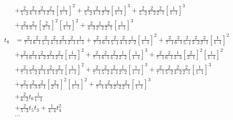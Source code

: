 \begin{equation*}
\begin{aligned}
\\
&
+ \frac{2}{5 \cdot 2} 
  \frac{2}{4 \cdot 1}
  \frac{2}{3 \cdot 1} 
  \frac{2}{2 \cdot 1} 
  \left[
  \frac{1}{1 \cdot 1}
  \right]^2
+ \frac{2}{5 \cdot 2}
  \frac{2}{4 \cdot 1}
  \frac{1}{2 \cdot 2} 
  \left[
  \frac{1}{1 \cdot 1}
  \right]^3
+ \frac{2}{5 \cdot 2} 
  \frac{2}{3 \cdot 2} 
  \frac{2}{2 \cdot 1} 
  \left[
  \frac{1}{1 \cdot 1}
  \right]^3 
\\
&
+ \frac{2}{4 \cdot 3}
  \frac{2}{3 \cdot 1}
  \left[
  \frac{2}{2 \cdot 1}
  \right]^2
  \left[
  \frac{1}{1 \cdot 1}
  \right]^2
+ \frac{2}{4 \cdot 3}
  \frac{1}{2 \cdot 2} 
  \frac{2}{2 \cdot 1}
  \left[
  \frac{1}{1 \cdot 1}
  \right]^3
\\
t_8 &
= \frac{2}{7 \cdot 1}
  \frac{2}{6 \cdot 1}
  \frac{2}{5 \cdot 1}
  \frac{2}{4 \cdot 1}
  \frac{2}{3 \cdot 1} 
  \frac{2}{2 \cdot 1} 
  \frac{1}{1 \cdot 1} 
+ \frac{2}{7 \cdot 1}
  \frac{2}{6 \cdot 1}
  \frac{2}{5 \cdot 1}
  \frac{2}{4 \cdot 1}
  \frac{1}{2 \cdot 2} 
  \left[
  \frac{1}{1 \cdot 1}
  \right]^2
+ \frac{2}{7 \cdot 1}
  \frac{2}{6 \cdot 1}
  \frac{2}{5 \cdot 1}
  \frac{2}{3 \cdot 2} 
  \frac{2}{2 \cdot 1} 
  \left[
  \frac{1}{1 \cdot 1}
  \right]^2 
\\
&
+ \frac{2}{7 \cdot 1}
  \frac{2}{6 \cdot 1}
  \frac{2}{4 \cdot 2}
  \frac{2}{3 \cdot 1} 
  \frac{2}{2 \cdot 1} 
  \left[
  \frac{1}{1 \cdot 1}
  \right]^2
+ \frac{2}{7 \cdot 1}
  \frac{2}{6 \cdot 1}
  \frac{2}{4 \cdot 2}
  \frac{1}{2 \cdot 2} 
  \left[
  \frac{1}{1 \cdot 1}
  \right]^3
+ \frac{2}{7 \cdot 1}
  \frac{2}{6 \cdot 1}
  \frac{1}{3 \cdot 3} 
  \left[
  \frac{2}{2 \cdot 1}
  \right]^2
  \left[
  \frac{1}{1 \cdot 1}
  \right]^2 
\\
&
+ \frac{2}{7 \cdot 1}
  \frac{2}{5 \cdot 2} 
  \frac{2}{4 \cdot 1}
  \frac{2}{3 \cdot 1} 
  \frac{2}{2 \cdot 1} 
  \left[
  \frac{1}{1 \cdot 1}
  \right]^2
+ \frac{2}{7 \cdot 1}
  \frac{2}{5 \cdot 2}
  \frac{2}{4 \cdot 1}
  \frac{1}{2 \cdot 2} 
  \left[
  \frac{1}{1 \cdot 1}
  \right]^3
+ \frac{2}{7 \cdot 1}
  \frac{2}{5 \cdot 2} 
  \frac{2}{3 \cdot 2} 
  \frac{2}{2 \cdot 1} 
  \left[
  \frac{1}{1 \cdot 1}
  \right]^3 
\\
&
+ \frac{2}{7 \cdot 1}
  \frac{2}{4 \cdot 3}
  \frac{2}{3 \cdot 1}
  \left[
  \frac{2}{2 \cdot 1}
  \right]^2
  \left[
  \frac{1}{1 \cdot 1}
  \right]^2
+ \frac{2}{7 \cdot 1}
  \frac{2}{4 \cdot 3}
  \frac{1}{2 \cdot 2} 
  \frac{2}{2 \cdot 1}
  \left[
  \frac{1}{1 \cdot 1}
  \right]^3
\\
& 
+ \frac{2}{6 \cdot 2} t_6 \frac{1}{1 \cdot 1}
\\
&
+ \frac{2}{5 \cdot 3} t_5 t_3
+ \frac{1}{4 \cdot 4} t_4^2
\\
&\ldots \\
\end{aligned}
\end{equation*}